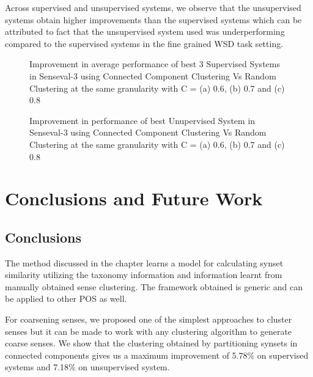 Across supervised and unsupervised systems, we observe that the unsupervised systems obtain higher improvements than the supervised systems which can be attributed to fact that the unsupervised system used was underperforming compared to the supervised systems in the fine grained WSD task setting.

\begin{figure}
\centering
{}
\caption{Improvement in average performance of best 3 Supervised Systems in Senseval-3 using Connected Component Clustering Vs Random Clustering at the same granularity with C = (a) 0.6, (b) 0.7 and (c) 0.8}
\label{fig:supervisedSystemsImprovement}
\end{figure}

\begin{figure}
\centering
{}
\caption{Improvement in performance of best Unupervised System in Senseval-3 using Connected Component Clustering Vs Random Clustering at the same granularity with C = (a) 0.6, (b) 0.7 and (c) 0.8}
\label{fig:unsupervisedSystemsImprovement}
\end{figure}

\section{Conclusions and Future Work}

\subsection{Conclusions}
The method discussed in the chapter learns a model for calculating synset similarity utilizing the taxonomy information and information learnt from manually obtained sense clustering. The framework obtained is generic and can be applied to other POS as well.

For coarsening senses, we proposed one of the simplest approaches to cluster senses but it can be made to work with any clustering algorithm to generate coarse senses. We show that the clustering obtained by partitioning synsets in  connected components gives us a maximum improvement of 5.78\% on supervised systems and 7.18\% on unsupervised system.


